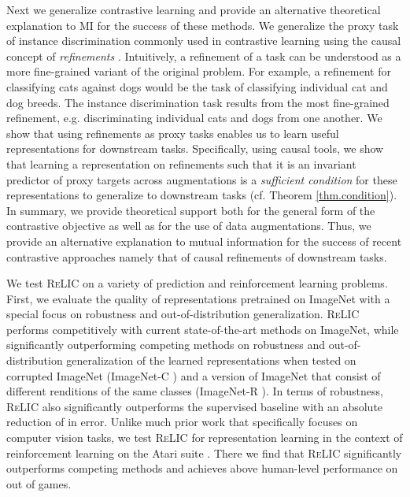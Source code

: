 \documentclass{article}
\newcommand{\relic}{\textsc{ReLIC}}
\begin{document}
Next we generalize contrastive learning and provide an alternative theoretical explanation to MI for the success of these methods.
We generalize the proxy task of instance discrimination commonly used in contrastive learning using the causal concept of \emph{refinements} \citep{chalupka2014visual}. 
Intuitively, a refinement of a task can be understood as a more fine-grained variant of the original problem. 
For example, a refinement for classifying cats against dogs would be the task of classifying individual cat and dog breeds. 
The instance discrimination task results from the most fine-grained refinement, e.g. discriminating individual cats and dogs from one another.
We show that using refinements as proxy tasks enables us to learn useful representations for downstream tasks.
Specifically, using causal tools, we show that learning a representation on refinements such that it is an invariant predictor of proxy targets across augmentations is a \emph{sufficient condition} for these representations to generalize to downstream tasks (cf. Theorem \ref{thm.condition}). 
In summary, we provide theoretical support both for the general form of the contrastive objective as well as for the use of data augmentations. 
Thus, we provide an alternative explanation to mutual information for the success of recent contrastive approaches namely that of causal refinements of downstream tasks. 

We test \relic{} on a variety of prediction and reinforcement learning problems. 
First, we evaluate the quality of representations pretrained on ImageNet with a special focus on robustness and out-of-distribution generalization.
\relic{} performs competitively with current state-of-the-art methods on ImageNet, while significantly outperforming competing methods on robustness and out-of-distribution generalization of the learned representations when tested on corrupted ImageNet (ImageNet-C \citep{hendrycks2019robustness}) and a version of ImageNet that consist of different renditions of the same classes (ImageNet-R \citep{hendrycks2020many}).
In terms of robustness, \relic{} also significantly outperforms the supervised baseline with an absolute reduction of  in error.
Unlike much prior work that specifically focuses on computer vision tasks, we test \relic{} for representation learning in the context of reinforcement learning on the Atari suite \citep{Bellemare2013TheAL}.
There we find that \relic{} significantly outperforms competing methods and achieves above human-level performance on  out of  games.
\end{document}

